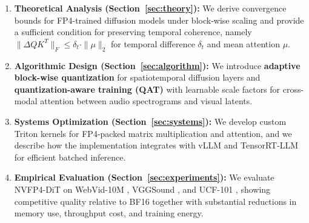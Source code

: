 \documentclass[journal,twoside]{IEEEtran}
\theoremstyle{definition}
\theoremstyle{remark}
\begin{document}
\begin{enumerate}
    \item \textbf{Theoretical Analysis (Section~\ref{sec:theory}):} We derive convergence bounds for FP4-trained diffusion models under block-wise scaling and provide a sufficient condition for preserving temporal coherence, namely $\|\Delta Q K^T\|_F \leq \delta_t \cdot \|\mu\|_2$ for temporal difference $\delta_t$ and mean attention $\mu$.
    
    \item \textbf{Algorithmic Design (Section~\ref{sec:algorithm}):} We introduce \textbf{adaptive block-wise quantization} for spatiotemporal diffusion layers and \textbf{quantization-aware training (QAT)} with learnable scale factors for cross-modal attention between audio spectrograms and visual latents.
    
    \item \textbf{Systems Optimization (Section~\ref{sec:systems}):} We develop custom Triton \cite{tillet2019triton} kernels for FP4-packed matrix multiplication and attention, and we describe how the implementation integrates with vLLM \cite{kwon2023efficient} and TensorRT-LLM \cite{nvidia2024tensorrt} for efficient batched inference.
    
    \item \textbf{Empirical Evaluation (Section~\ref{sec:experiments}):} We evaluate NVFP4-DiT on WebVid-10M \cite{bain2021frozen}, VGGSound \cite{chen2020vggsound}, and UCF-101 \cite{soomro2012ucf101}, showing competitive quality relative to BF16 together with substantial reductions in memory use, throughput cost, and training energy.
\end{enumerate}
\end{document}
